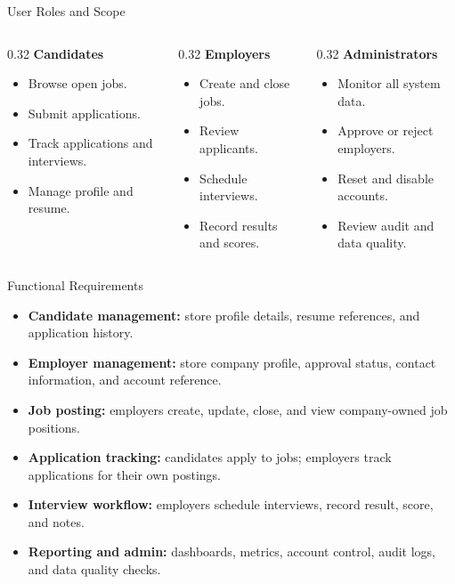 \documentclass[aspectratio=169]{beamer}
\begin{document}
\begin{frame}{User Roles and Scope}
  \begin{columns}[T,onlytextwidth]
    \begin{column}{0.32\textwidth}
      \textbf{Candidates}
      \begin{itemize}
        \item Browse open jobs.
        \item Submit applications.
        \item Track applications and interviews.
        \item Manage profile and resume.
      \end{itemize}
    \end{column}
    \begin{column}{0.32\textwidth}
      \textbf{Employers}
      \begin{itemize}
        \item Create and close jobs.
        \item Review applicants.
        \item Schedule interviews.
        \item Record results and scores.
      \end{itemize}
    \end{column}
    \begin{column}{0.32\textwidth}
      \textbf{Administrators}
      \begin{itemize}
        \item Monitor all system data.
        \item Approve or reject employers.
        \item Reset and disable accounts.
        \item Review audit and data quality.
      \end{itemize}
    \end{column}
  \end{columns}
\end{frame}

\begin{frame}{Functional Requirements}
  \begin{itemize}
    \item \textbf{Candidate management:} store profile details, resume references, and application history.
    \item \textbf{Employer management:} store company profile, approval status, contact information, and account reference.
    \item \textbf{Job posting:} employers create, update, close, and view company-owned job positions.
    \item \textbf{Application tracking:} candidates apply to jobs; employers track applications for their own postings.
    \item \textbf{Interview workflow:} employers schedule interviews, record result, score, and notes.
    \item \textbf{Reporting and admin:} dashboards, metrics, account control, audit logs, and data quality checks.
  \end{itemize}
\end{frame}
\end{document}

